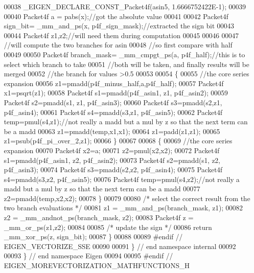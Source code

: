 \begin{DoxyCode}
00038   \_EIGEN\_DECLARE\_CONST\_Packet4f(asin5, 1.6666752422E-1);
00039 
00040   Packet4f a = pabs(x);\textcolor{comment}{//got the absolute value}
00041 
00042   Packet4f sign\_bit= \_mm\_and\_ps(x, p4f\_sign\_mask);\textcolor{comment}{//extracted the sign bit}
00043 
00044   Packet4f z1,z2;\textcolor{comment}{//will need them during computation    }
00045 
00046 
00047 \textcolor{comment}{//will compute the two branches for asin}
00048 \textcolor{comment}{//so first compare with half}
00049 
00050   Packet4f branch\_mask= \_mm\_cmpgt\_ps(a, p4f\_half);\textcolor{comment}{//this is to select which branch to take}
00051 \textcolor{comment}{//both will be taken, and finally results will be merged}
00052 \textcolor{comment}{//the branch for values >0.5}
00053 
00054     \{
00055 \textcolor{comment}{//the core series expansion }
00056     z1=pmadd(p4f\_minus\_half,a,p4f\_half);
00057     Packet4f x1=psqrt(z1);
00058     Packet4f s1=pmadd(p4f\_asin1, z1, p4f\_asin2);
00059     Packet4f s2=pmadd(s1, z1, p4f\_asin3);
00060     Packet4f s3=pmadd(s2,z1, p4f\_asin4);
00061     Packet4f s4=pmadd(s3,z1, p4f\_asin5);
00062     Packet4f temp=pmul(s4,z1);\textcolor{comment}{//not really a madd but a mul by z so that the next term can be a madd}
00063     z1=pmadd(temp,x1,x1);
00064     z1=padd(z1,z1);
00065     z1=psub(p4f\_pi\_over\_2,z1);
00066     \}
00067 
00068     \{
00069 \textcolor{comment}{//the core series expansion }
00070     Packet4f x2=a;
00071     z2=pmul(x2,x2);
00072     Packet4f s1=pmadd(p4f\_asin1, z2, p4f\_asin2);
00073     Packet4f s2=pmadd(s1, z2, p4f\_asin3);
00074     Packet4f s3=pmadd(s2,z2, p4f\_asin4);
00075     Packet4f s4=pmadd(s3,z2, p4f\_asin5);
00076     Packet4f temp=pmul(s4,z2);\textcolor{comment}{//not really a madd but a mul by z so that the next term can be a madd}
00077     z2=pmadd(temp,x2,x2);
00078     \}
00079 
00080 \textcolor{comment}{/* select the correct result from the two branch evaluations */}
00081   z1  = \_mm\_and\_ps(branch\_mask, z1);
00082   z2  = \_mm\_andnot\_ps(branch\_mask, z2);
00083   Packet4f z  = \_mm\_or\_ps(z1,z2);
00084 
00085 \textcolor{comment}{/* update the sign */}
00086   \textcolor{keywordflow}{return} \_mm\_xor\_ps(z, sign\_bit);
00087 \}
00088 
00089 \textcolor{preprocessor}{#endif // EIGEN\_VECTORIZE\_SSE}
00090 
00091 \} \textcolor{comment}{// end namespace internal}
00092 
00093 \} \textcolor{comment}{// end namespace Eigen}
00094 
00095 \textcolor{preprocessor}{#endif // EIGEN\_MOREVECTORIZATION\_MATHFUNCTIONS\_H}
\end{DoxyCode}
